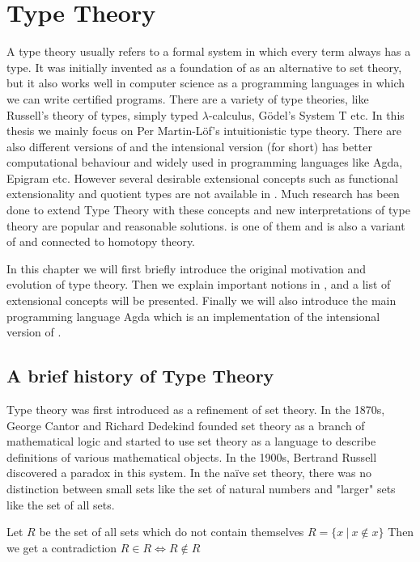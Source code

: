 \chapter{Type Theory}
\label{bg}

A type theory usually refers to a formal system in which every term always has a type. It was initially invented as a foundation of \maths as an alternative to set theory, but it also works well in computer science as a programming languages  in which we can write certified programs. There are a variety of type theories, like Russell's theory of types, simply typed $\lambda$-calculus, Gödel's System T \cite{gdl:1931} etc. In this thesis we mainly focus on Per Martin-L\"{o}f's intuitionistic type theory. There are also different versions of \mltt and the intensional version (\itt for short) has better computational behaviour and widely used in programming languages like Agda, Epigram etc. However several desirable extensional concepts such as functional extensionality and quotient types are not available in \itt. Much research has been done to extend Type Theory with these concepts and new interpretations of type theory are popular and reasonable solutions. \hott is one of them and is also a variant of \mltt and connected to homotopy theory. 


In this chapter we will first briefly introduce the original motivation and evolution of type theory. Then we explain important notions in \mltt, and a list of extensional concepts will be presented. Finally we will also introduce the main programming language Agda which is an implementation of the intensional version of \mltt.


\section{A brief history of Type Theory}

Type theory was first introduced as a refinement of set theory. 
In the 1870s, George Cantor and Richard Dedekind founded set theory as a branch of mathematical logic and started to use set theory as a language to describe definitions of various mathematical objects.
In the 1900s, Bertrand Russell discovered a paradox in this system. In the naïve set theory, there was no distinction between small sets like the set of natural numbers and "larger" sets like the set of all sets.

\begin{example}
Let $R$ be the set of all sets which do not contain themselves
$R = \{x ~| ~x \not\in  x\}$
Then we get a contradiction
$R \in R \iff R \not\in R$
\end{example}

